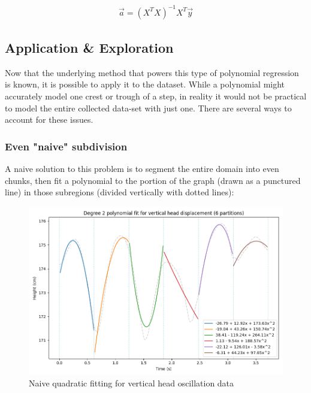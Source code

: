 \documentclass[12pt, a4paper]{article}
\begin{document}
\begin{align*}
    \vec{a}=(X^TX)^{-1}X^T\vec{y}
\end{align*}

\subsection{Application \& Exploration}
Now that the underlying method that powers this type of polynomial regression is
known, it is possible to apply it to the dataset. While a polynomial might
accurately model one crest or trough of a step, in reality it would not be
practical to model the entire collected data-set with just one. There are
several ways to account for these issues. \\

\subsubsection{Even "naive" subdivision}
\label{section_naive_seg}
A naive solution to this problem is to segment the entire domain into even
chunks, then fit a polynomial to the portion of the graph (drawn as a punctured
line) in those subregions (divided vertically with dotted lines):

\begin{figure}[H]
    \centering
    \includegraphics[width=12cm]{p_naive_head_2.png}
    \caption{Naive quadratic fitting for vertical head oscillation data}
    \label{naive_head}
\end{figure}
\end{document}
